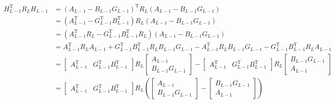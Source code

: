 \documentclass{article}
\begin{document}
\begin{align*}
H_{L-1}^{\text{T}} R_{L} H_{L-1} &= \left( A_{L-1} - B_{L-1} G_{L-1} \right)^{\text{T}} R_{L} \left( A_{L-1} - B_{L-1} G_{L-1} \right) \\
&= \left( A_{L-1}^{\text{T}} - G_{L-1}^{\text{T}} B_{L-1}^{\text{T}} \right) R_{L} \left( A_{L-1} - B_{L-1} G_{L-1} \right) \\
&= \left( A_{L-1}^{\text{T}} R_{L} - G_{L-1}^{\text{T}} B_{L-1}^{\text{T}} R_{L} \right) \left( A_{L-1} - B_{L-1} G_{L-1} \right) \\
&= A_{L-1}^{\text{T}} R_{L} A_{L-1} + G_{L-1}^{\text{T}} B_{L-1}^{\text{T}} R_{L} B_{L-1} G_{L-1} - A_{L-1}^{\text{T}} R_{L} B_{L-1} G_{L-1} - G_{L-1}^{\text{T}} B_{L-1}^{\text{T}} R_{L} A_{L-1} \\
&= 
\begin{bmatrix}
A_{L-1}^{\text{T}} & G_{L-1}^{\text{T}} B_{L-1}^{\text{T}}
\end{bmatrix}
R_{L}
\begin{bmatrix}
A_{L-1} \\
B_{L-1} G_{L-1}
\end{bmatrix}
-
\begin{bmatrix}
A_{L-1}^{\text{T}} & G_{L-1}^{\text{T}} B_{L-1}^{\text{T}}
\end{bmatrix}
R_{L}
\begin{bmatrix}
B_{L-1} G_{L-1} \\
A_{L-1}
\end{bmatrix} \\ 
&= 
\begin{bmatrix}
A_{L-1}^{\text{T}} & G_{L-1}^{\text{T}} B_{L-1}^{\text{T}}
\end{bmatrix}
R_{L}
\left(
\begin{bmatrix}
A_{L-1} \\
B_{L-1} G_{L-1}
\end{bmatrix}
-
\begin{bmatrix}
B_{L-1} G_{L-1} \\
A_{L-1}
\end{bmatrix}
\right)
\end{align*}
\end{document}
